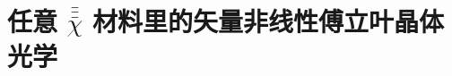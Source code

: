 \chapter{任意 \texorpdfstring{$\bar{\bar{\bar{\chi}}}$}{$\bar{\bar{\bar{\text{χ}}}}$} 材料里的矢量非线性傅立叶晶体光学}\label{chap:NFCO}
